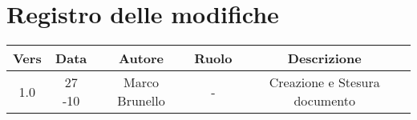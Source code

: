 \section{Registro delle modifiche}

\begin{table}[htbp]
	\begin{tabular}{|c|c|c|c|c|}
		\hline
		\rowcolor[gray]{0.9}
		Vers & Data & Autore & Ruolo & Descrizione \\
		\hline
		1.0 & 27 -10 & Marco Brunello & - & Creazione e Stesura documento\\
                    \hline
	\end{tabular}
\end{table}